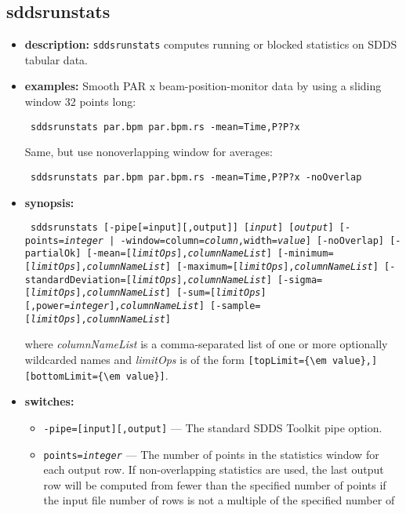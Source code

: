 \newpage
\subsection{sddsrunstats}
\label{sddsrunstats}

\begin{itemize}
\item {\bf description:}
{\tt sddsrunstats} computes running or blocked statistics on SDDS
tabular data.
\item {\bf examples:}
Smooth PAR x beam-position-monitor data by using a sliding window 32
points long:
\begin{flushleft}{\tt
sddsrunstats par.bpm par.bpm.rs -mean=Time,P?P?x 
}\end{flushleft}
Same, but use nonoverlapping window for averages:
\begin{flushleft}{\tt
sddsrunstats par.bpm par.bpm.rs -mean=Time,P?P?x  -noOverlap
}\end{flushleft}
\item {\bf synopsis:}
\begin{flushleft}{\tt
sddsrunstats [-pipe[=input][,output]] [{\em input}] [{\em output}]
[{-points={\em integer} | -window=column={\em column},width={\em value}}] [-noOverlap]
[-partialOk] 
[-mean=[{\em limitOps}],{\em columnNameList}]
[-minimum=[{\em limitOps}],{\em columnNameList}]
[-maximum=[{\em limitOps}],{\em columnNameList}]
[-standardDeviation=[{\em limitOps}],{\em columnNameList}]
[-sigma=[{\em limitOps}],{\em columnNameList}]
[-sum=[{\em limitOps}][,power={\em integer}],{\em columnNameList}] 
[-sample=[{\em limitOps}],{\em columnNameList}]
}\end{flushleft}
where {\em columnNameList} is a comma-separated list of one or more optionally wildcarded names and
{\em limitOps} is of the form \verb|[topLimit={\em value},][bottomLimit={\em value}]|.
\item {\bf switches:}
    \begin{itemize}
    \item {\tt -pipe=[input][,output]} --- The standard SDDS Toolkit pipe option.
    \item {\tt points={\em integer}} --- The number of points in the statistics window for each
        output row.  If non-overlapping statistics are used, the last output row
        will be computed from fewer than the specified number of points if the
        input file number of rows is not a multiple of the specified number of 

\end{itemize}
\end{itemize}
